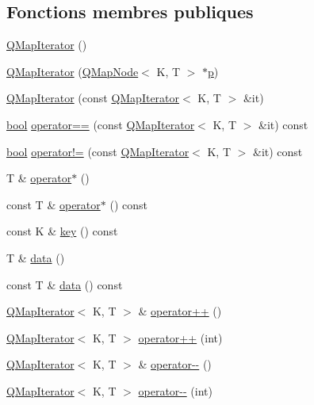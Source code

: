 \subsection*{Fonctions membres publiques}
\begin{DoxyCompactItemize}
\item 
\hyperlink{class_q_map_iterator_aca07d44f63b18f752c502c77f5d6f502}{Q\+Map\+Iterator} ()
\item 
\hyperlink{class_q_map_iterator_aa32eaacfcdc51d680897d340766a4ee7}{Q\+Map\+Iterator} (\hyperlink{struct_q_map_node}{Q\+Map\+Node}$<$ K, T $>$ $\ast$\hyperlink{060__command__switch_8tcl_a15229b450f26d8fa1c10bea4f3279f4d}{p})
\item 
\hyperlink{class_q_map_iterator_aa71f55ddf81484e17429e6243c6f4313}{Q\+Map\+Iterator} (const \hyperlink{class_q_map_iterator}{Q\+Map\+Iterator}$<$ K, T $>$ \&it)
\item 
\hyperlink{qglobal_8h_a1062901a7428fdd9c7f180f5e01ea056}{bool} \hyperlink{class_q_map_iterator_a502ab3897c9503477ee2936b3d85dba5}{operator==} (const \hyperlink{class_q_map_iterator}{Q\+Map\+Iterator}$<$ K, T $>$ \&it) const 
\item 
\hyperlink{qglobal_8h_a1062901a7428fdd9c7f180f5e01ea056}{bool} \hyperlink{class_q_map_iterator_ac2ee1bfc14e3b419a03e86fb794a196b}{operator!=} (const \hyperlink{class_q_map_iterator}{Q\+Map\+Iterator}$<$ K, T $>$ \&it) const 
\item 
T \& \hyperlink{class_q_map_iterator_a3f0b1409ac53c00c0c86bbf10ec975dc}{operator$\ast$} ()
\item 
const T \& \hyperlink{class_q_map_iterator_a686105690ff602629c0304514347c43a}{operator$\ast$} () const 
\item 
const K \& \hyperlink{class_q_map_iterator_ab6d0e295c97dc61e011a1cf6b4444875}{key} () const 
\item 
T \& \hyperlink{class_q_map_iterator_a930235c1c9958fa33af55182231c01f9}{data} ()
\item 
const T \& \hyperlink{class_q_map_iterator_a4fd846fc20318753088b4327f1c8ca62}{data} () const 
\item 
\hyperlink{class_q_map_iterator}{Q\+Map\+Iterator}$<$ K, T $>$ \& \hyperlink{class_q_map_iterator_a1914ea33f77a3a2217ec5ceb171ea680}{operator++} ()
\item 
\hyperlink{class_q_map_iterator}{Q\+Map\+Iterator}$<$ K, T $>$ \hyperlink{class_q_map_iterator_a26dfff9498e136be9013686ce84e87be}{operator++} (int)
\item 
\hyperlink{class_q_map_iterator}{Q\+Map\+Iterator}$<$ K, T $>$ \& \hyperlink{class_q_map_iterator_a3e9d04da406d2daa9163c76a001de6b6}{operator-\/-\/} ()
\item 
\hyperlink{class_q_map_iterator}{Q\+Map\+Iterator}$<$ K, T $>$ \hyperlink{class_q_map_iterator_aeaf069ac8a6f38d9732ec4adf69f4c0f}{operator-\/-\/} (int)
\end{DoxyCompactItemize}
